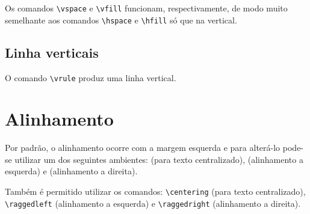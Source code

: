 Os comandos \lstinline!\vspace! e
\lstinline!\vfill! funcionam, respectivamente, de modo muito semelhante aos
comandos \lstinline!\hspace! e \lstinline!\hfill! só que na vertical.

\subsection{Linha verticais}
O comando \lstinline!\vrule! produz uma linha vertical.

\section{Alinhamento}
Por padrão, o alinhamento ocorre com a margem esquerda e para
alterá-lo pode-se utilizar um dos seguintes ambientes:  (para
texto centralizado),  (alinhamento a esquerda) e
 (alinhamento a direita). \\

Também é permitido utilizar os comandos: \lstinline!\centering! (para texto
centralizado), \lstinline!\raggedleft! (alinhamento a esquerda) e
\lstinline!\raggedright! (alinhamento a direita).
